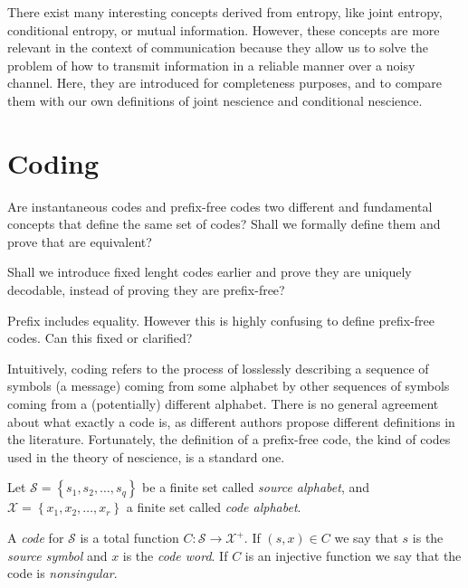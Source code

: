 There exist many interesting concepts derived from entropy, like joint entropy, conditional entropy, or mutual information. However, these concepts are more relevant in the context of communication because they allow us to solve the problem of how to transmit information in a reliable manner over a noisy channel. Here, they are introduced for completeness purposes, and to compare them with our own definitions of joint nescience and conditional nescience.

%
%

\section{Coding}
\label{Codes}

{\color{red} Are instantaneous codes and prefix-free codes two different and fundamental concepts that define the same set of codes? Shall we formally define them and prove that are equivalent?}

{\color{red} Shall we introduce fixed lenght codes earlier and prove they are uniquely decodable, instead of proving they are prefix-free?}

{\color{red} Prefix includes equality. However this is highly confusing to define prefix-free codes. Can this fixed or clarified?}

Intuitively, coding refers to the process of losslessly describing a sequence of symbols (a message) coming from some alphabet by other sequences of symbols coming from a (potentially) different alphabet. There is no general agreement about what exactly a code is, as different authors propose different definitions in the literature. Fortunately, the definition of a prefix-free code, the kind of codes used in the theory of nescience, is a standard one.

Let $\mathcal{S}=\left\{ s_{1},s_{2},\ldots,s_{q}\right\}$ be a finite set called \emph{source alphabet}, and $\mathcal{X}=\left\{ x_{1}, x_{2}, \ldots, x_{r} \right\}$ a finite set called \emph{code alphabet}.

\begin{definition}[Code]
A \emph{code} for $\mathcal{S}$ is a total function $C:\mathcal{S}\rightarrow\mathcal{X}^{+}$. If $(s,x) \in C$ we say that $s$ is the \emph{source symbol} and $x$ is the \emph{code word}. If $C$ is an injective function we say that the code is \emph{nonsingular}.
\end{definition}

